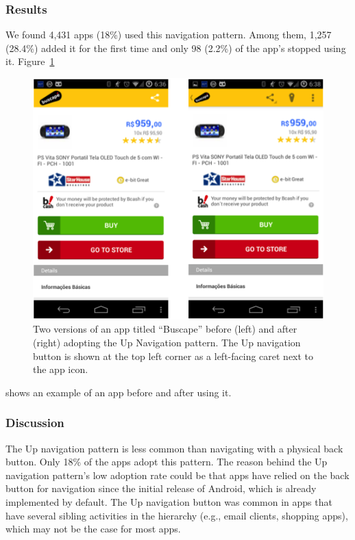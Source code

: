 \subsubsection{Results}
We found 4,431 apps (18\%) used this navigation pattern. 
Among them, 1,257 (28.4\%) added it for the first time and only 98 (2.2\%) of the app's stopped using it. 
Figure~\ref{fig:fig_upnav}
\begin{figure}[!t]
	\centering
	\includegraphics{figures/design-pattern-changes/upnav}
	\caption{Two versions of an app titled ``Buscape'' before (left) and after (right) adopting the Up Navigation pattern. The Up navigation button is shown at the top left corner as a left-facing caret next to the app icon.}
	\label{fig:fig_upnav}
\end{figure}
shows an example of an app before and after using it.

\subsubsection{Discussion}
The Up navigation pattern is less common than navigating with a physical back button. Only 18\% of the apps adopt this pattern. 
The reason behind the Up navigation pattern's low adoption rate could be that apps have relied on the back button for navigation since the initial release of Android, which is already implemented by default. 
The Up navigation button was common in apps that have several sibling activities in the hierarchy (e.g., email clients, shopping apps), which may not be the case for most apps.

